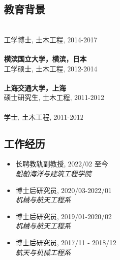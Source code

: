 \documentclass[10pt]{article}
\newenvironment{myitemize}
{ \begin{itemize}
    \setlength{\itemsep}{0pt}
    \setlength{\parskip}{0pt}
    \setlength{\parsep}{0pt}     }
{ \end{itemize}                  }
\begin{document}
\subsection*{教育背景}

	\\		
\indent 工学博士, 土木工程, 2014-2017  \\
\\
 {\bf\color{Blue} 横滨国立大学，横滨，日本}\\
\indent 工学硕士, 土木工程, 2012-2014\\
\\
{\bf\color{Blue} 上海交通大学，上海}\\
\indent 硕士研究生, 土木工程, 2011-2012\\

\\
\indent 学士, 土木工程, 2011-2012\\

\subsection*{工作经历}

\begin{myitemize}
\item 长聘教轨副教授, 2022/02 至今 \\
{\em 船舶海洋与建筑工程学院}
\end{myitemize}

\begin{myitemize}
\item  博士后研究员, 2020/03-2022/01\\
{\em 机械与航天工程系}
\end{myitemize}

\begin{myitemize}
\item  博士后研究员, 2019/01-2020/02\\
{\em 机械与航天工程系}
\end{myitemize}

\begin{myitemize}
\item 博士后研究员, 2017/11 - 2018/12 \\
{\em 航天与机械工程系}
\end{myitemize}
\end{document}
